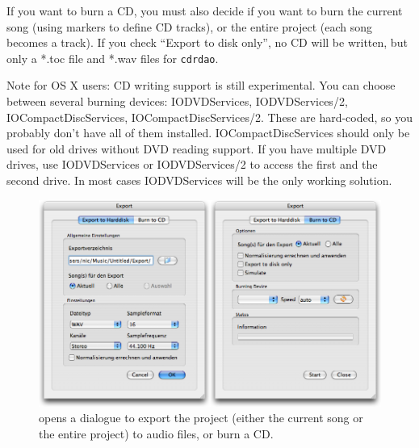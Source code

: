 If you want to burn a CD, you must also decide if you want to burn the current song (using markers to define CD tracks), or the entire project (each song becomes a track). If you check ``Export to disk only'', no CD will be written, but only a *.toc file and *.wav files for \texttt{cdrdao}.

Note for OS X users: CD writing support is still experimental. You can choose between several burning devices: IODVDServices, IODVDServices/2, IOCompactDiscServices, IOCompactDiscServices/2. These are hard-coded, so you probably don't have all of them installed. IOCompactDiscServices should only be used for old drives without DVD reading support. If you have multiple DVD drives, use IODVDServices or IODVDServices/2 to access the first and the second drive. In most cases IODVDServices will be the only working solution.

\begin{figure}[t]
 \centering\includegraphics[width=\textwidth]{images/exportdlg}
 \caption{ opens a dialogue to export the project (either the current song or the entire project) to audio files, or burn a CD.}
 \label{fig_exportdlg}
\end{figure}

